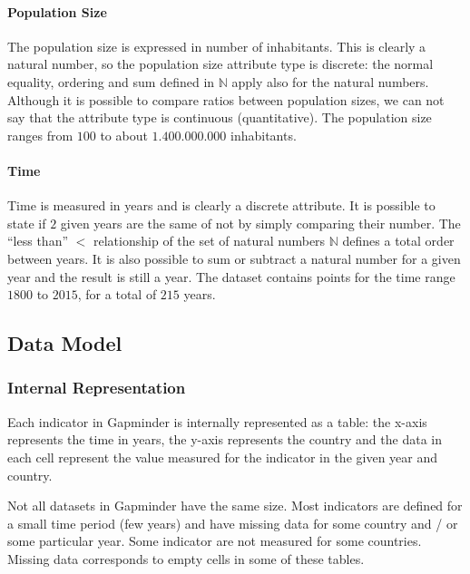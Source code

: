 \paragraph{Population Size}
The population size is expressed in number of inhabitants.
This is clearly a natural number, so the population size attribute type is discrete:
the normal equality, ordering and sum defined in $\mathbb{N}$ apply also for the natural numbers.
Although it is possible to compare ratios between population sizes, we can not say that the attribute type is continuous (quantitative). 
The population size ranges from $100$ to about $1.400.000.000$ inhabitants.

\paragraph{Time}
Time is measured in years and is clearly a discrete attribute.
It is possible to state if $2$ given years are the same of not by simply comparing their number.
The ``less than'' $<$ relationship of the set of natural numbers $\mathbb{N}$ defines a total order between years.
It is also possible to sum or subtract a natural number for a given year and the result is still a year.
The dataset contains points for the time range $1800$ to $2015$, for a total of $215$ years.


\subsection{Data Model}

\subsubsection{Internal Representation}
\label{subsubsec:internal_representation}
Each indicator in Gapminder is internally represented as a table:
the x-axis represents the time in years, the y-axis represents the country and the data in each cell represent the value measured for the indicator in the given year and country.

Not all datasets in Gapminder have the same size.
Most indicators are defined for a small time period (few years) and have missing data for some country and / or some particular year.
Some indicator are not measured for some countries.
Missing data corresponds to empty cells in some of these tables.

